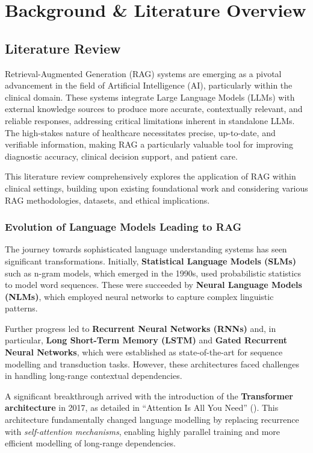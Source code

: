 \chapter{Background \& Literature Overview}
\section{Literature Review}

Retrieval-Augmented Generation (RAG) systems are emerging as a pivotal advancement in the field of Artificial Intelligence (AI), particularly within the clinical domain. These systems integrate Large Language Models (LLMs) with external knowledge sources to produce more accurate, contextually relevant, and reliable responses, addressing critical limitations inherent in standalone LLMs. The high-stakes nature of healthcare necessitates precise, up-to-date, and verifiable information, making RAG a particularly valuable tool for improving diagnostic accuracy, clinical decision support, and patient care.

This literature review comprehensively explores the application of RAG within clinical settings, building upon existing foundational work and considering various RAG methodologies, datasets, and ethical implications.

\subsection{Evolution of Language Models Leading to RAG}

The journey towards sophisticated language understanding systems has seen significant transformations. Initially, \textbf{Statistical Language Models (SLMs)} such as n-gram models, which emerged in the 1990s, used probabilistic statistics to model word sequences. These were succeeded by \textbf{Neural Language Models (NLMs)}, which employed neural networks to capture complex linguistic patterns.

Further progress led to \textbf{Recurrent Neural Networks (RNNs)} and, in particular, \textbf{Long Short-Term Memory (LSTM)} and \textbf{Gated Recurrent Neural Networks}, which were established as state-of-the-art for sequence modelling and transduction tasks. However, these architectures faced challenges in handling long-range contextual dependencies.

A significant breakthrough arrived with the introduction of the \textbf{Transformer architecture} in 2017, as detailed in ``Attention Is All You Need'' (\citep{vaswani2017attention}). This architecture fundamentally changed language modelling by replacing recurrence with \textit{self-attention mechanisms}, enabling highly parallel training and more efficient modelling of long-range dependencies.

